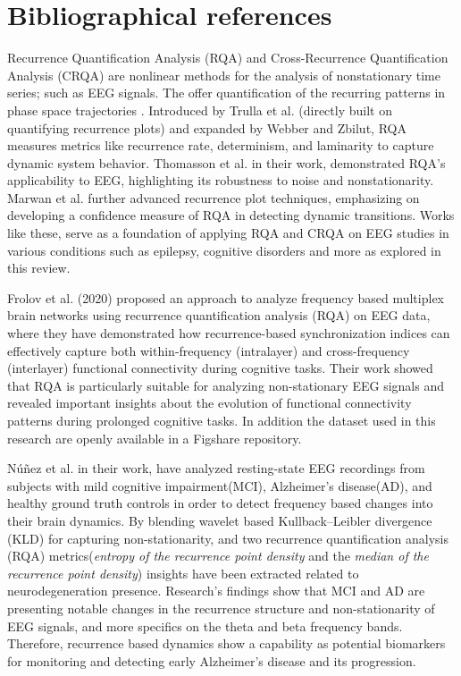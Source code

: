 \documentclass{article}
\begin{document}
	\section*{Bibliographical references}
			Recurrence Quantification Analysis (RQA) and Cross-Recurrence Quantification Analysis (CRQA) are
			nonlinear methods for the analysis of nonstationary time series; such as EEG signals. 
			The offer quantification of the recurring patterns in phase space trajectories \cite{trulla1996, webber2005}. 
			Introduced by Trulla et al.\cite{trulla1996} (directly built on quantifying recurrence plots\cite{eckmann1987}) 
			and expanded by Webber and Zbilut\cite{webber2005}, RQA measures metrics 
			like recurrence rate, determinism, and laminarity to capture dynamic system behavior. 
			Thomasson et al.\cite{thomasson2002} in their work, demonstrated RQA’s applicability to EEG, highlighting its robustness to noise
			and nonstationarity. Marwan et al.\cite{marwan2013} further advanced recurrence plot techniques,
			emphasizing on developing a confidence measure of RQA in detecting dynamic transitions.
			Works like these, serve as a foundation of applying RQA and CRQA on EEG 
			studies in various conditions such as epilepsy, cognitive disorders and more 
			as explored in this review.

			Frolov et al.\cite{frolov} (2020) proposed an approach to analyze frequency based multiplex brain networks
			using recurrence quantification analysis (RQA) 
			on EEG data, where they have demonstrated how recurrence-based 
			synchronization indices can effectively capture 
			both within-frequency (intralayer) and cross-frequency (interlayer) 
			functional connectivity during cognitive tasks. 
			Their work showed that RQA is particularly suitable for analyzing 
			non-stationary EEG signals and revealed
			important insights about the evolution of functional connectivity 
			patterns during prolonged cognitive tasks. In addition the dataset
			used in this research are openly available in a Figshare repository.

			Núñez et al. \cite{nunez2020characterization} in their work, have analyzed
			resting-state EEG recordings from subjects with mild cognitive impairment(MCI), 
			Alzheimer's disease(AD), and healthy ground truth controls in order to detect 
			frequency based changes into their brain dynamics. 
			By blending wavelet based Kullback–Leibler divergence
			(KLD) for capturing non-stationarity,
			and two recurrence quantification analysis (RQA)
			metrics(\textit{entropy of the recurrence point density}
			and the \textit{median of the recurrence point density}) insights have been
			extracted related to neurodegeneration presence.
			Research's findings show that MCI and AD are presenting notable changes in 
			the recurrence structure and non-stationarity of EEG signals,
			and more specifics on the theta and beta frequency bands.
			Therefore, recurrence based dynamics show a capability as potential 
			biomarkers for monitoring and detecting early Alzheimer's disease and its progression.
\end{document}
